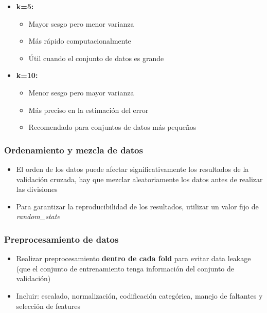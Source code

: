 \documentclass[12pt]{article}
\begin{document}
\begin{itemize}
    \item \textbf{k=5:} 
    \begin{itemize}
        \item Mayor sesgo pero menor varianza
        \item Más rápido computacionalmente
        \item Útil cuando el conjunto de datos es grande
    \end{itemize}
    
    \item \textbf{k=10:}
    \begin{itemize}
        \item Menor sesgo pero mayor varianza
        \item Más preciso en la estimación del error
        \item Recomendado para conjuntos de datos más pequeños
    \end{itemize}
\end{itemize}

\subsubsection{Ordenamiento y mezcla de datos}
\begin{itemize}
    \item El orden de los datos puede afectar significativamente los resultados de la validación cruzada, hay que mezclar aleatoriamente los datos antes de realizar las divisiones
    \item Para garantizar la reproducibilidad de los resultados, utilizar un valor fijo de \textit{random\_state}
\end{itemize}

\subsubsection{Preprocesamiento de datos}
\begin{itemize}
    \item Realizar preprocesamiento \textbf{dentro de cada fold} para evitar data leakage (que el conjunto de entrenamiento tenga información del conjunto de validación)
    \item Incluir: escalado, normalización, codificación categórica, manejo de faltantes y selección de features
\end{itemize}
\end{document}
